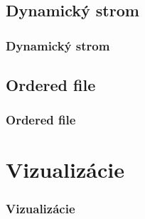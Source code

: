 \documentclass{beamer}
\begin{document}
\subsection{Dynamický strom}
\begin{frame}
    \frametitle{Dynamický strom}
\end{frame}

\subsection{Ordered file}
\begin{frame}
    \frametitle{Ordered file}
\end{frame}

\section{Vizualizácie}
\begin{frame}
    \frametitle{Vizualizácie}
\end{frame}
\end{document}
